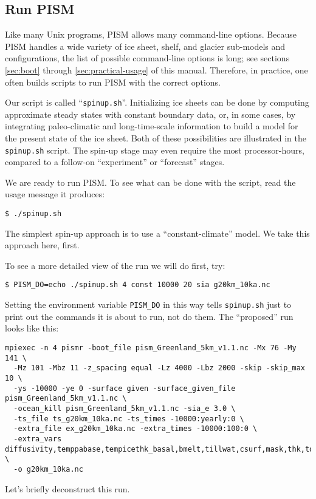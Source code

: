 \subsection{Run PISM}   \label{subsect:runscript}  Like many Unix programs, PISM allows many command-line options.  Because PISM handles a wide variety of ice sheet, shelf, and glacier sub-models and configurations, the list of possible command-line options is long; see sections \ref{sec:boot} through \ref{sec:practical-usage} of this manual.  Therefore, in practice, one often builds scripts to run PISM with the correct options.

Our script is called ``\texttt{spinup.sh}''.  Initializing ice sheets can be done by computing approximate steady states with constant boundary data, or, in some cases, by integrating paleo-climatic and long-time-scale information to build a model for the present state of the ice sheet.  Both of these possibilities are illustrated in the \texttt{spinup.sh} script.  The spin-up stage may even require the most processor-hours, compared to a follow-on ``experiment'' or ``forecast'' stages.

We are ready to run PISM.  To see what can be done with the script, read the usage message it produces:
\begin{verbatim}
$ ./spinup.sh
\end{verbatim}
The simplest spin-up approach is to use a ``constant-climate'' model.  We take this approach here, first.

To see a more detailed view of the run we will do first, try:
\begin{verbatim}
$ PISM_DO=echo ./spinup.sh 4 const 10000 20 sia g20km_10ka.nc
\end{verbatim}
Setting the environment variable \texttt{PISM_DO} in this way tells \texttt{spinup.sh} just to print out the commands it is about to run, not do them.  The ``proposed'' run looks like this:
\small
\begin{verbatim}
mpiexec -n 4 pismr -boot_file pism_Greenland_5km_v1.1.nc -Mx 76 -My 141 \
  -Mz 101 -Mbz 11 -z_spacing equal -Lz 4000 -Lbz 2000 -skip -skip_max 10 \
  -ys -10000 -ye 0 -surface given -surface_given_file pism_Greenland_5km_v1.1.nc \
  -ocean_kill pism_Greenland_5km_v1.1.nc -sia_e 3.0 \
  -ts_file ts_g20km_10ka.nc -ts_times -10000:yearly:0 \
  -extra_file ex_g20km_10ka.nc -extra_times -10000:100:0 \
  -extra_vars diffusivity,temppabase,tempicethk_basal,bmelt,tillwat,csurf,mask,thk,topg,usurf \
  -o g20km_10ka.nc
\end{verbatim}
\normalsize
Let's briefly deconstruct this run.

